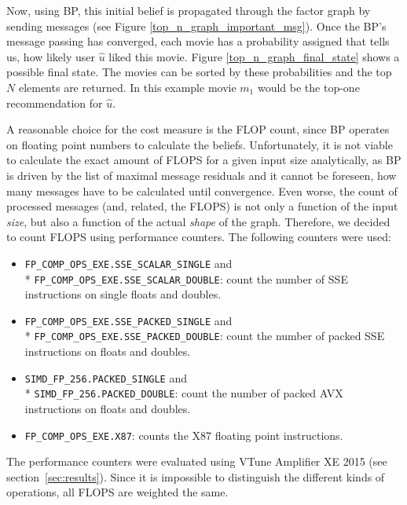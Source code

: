Now, using BP, this initial belief is propagated through the factor graph by sending messages (see Figure \ref{top_n_graph_important_msg}). Once the BP's message passing has converged, each movie has a probability assigned that tells us, how likely user $\hat u$ liked this movie. Figure \ref{top_n_graph_final_state} shows a possible final state. The movies can be sorted by these probabilities and the top $N$ elements are returned. In this example movie $m_1$ would be the top-one recommendation for $\hat u$.


A reasonable choice for the cost measure is the FLOP count, since BP operates on floating point numbers to calculate the beliefs. Unfortunately, it is not viable to calculate the exact amount of FLOPS for a given input size analytically, as BP is driven by the list of maximal message residuals and it cannot be foreseen, how many messages have to be calculated until convergence. Even worse, the count of processed messages (and, related, the FLOPS) is not only a function of the input \textit{size}, but also a function of the actual \textit{shape} of the graph. Therefore, we decided to count FLOPS using performance counters. The following counters were used:

\begin{itemize}
	\item \texttt{FP\_COMP\_OPS\_EXE.SSE\_SCALAR\_SINGLE} and \\* \texttt{FP\_COMP\_OPS\_EXE.SSE\_SCALAR\_DOUBLE}: count the number of SSE instructions on single floats and doubles.
	\item \texttt{FP\_COMP\_OPS\_EXE.SSE\_PACKED\_SINGLE} and \\* \texttt{FP\_COMP\_OPS\_EXE.SSE\_PACKED\_DOUBLE}: count the number of packed SSE instructions on floats and doubles.
	\item \texttt{SIMD\_FP\_256.PACKED\_SINGLE} and \\* \texttt{SIMD\_FP\_256.PACKED\_DOUBLE}: count the number of packed AVX instructions on floats and doubles.
	\item \texttt{FP\_COMP\_OPS\_EXE.X87}: counts the X87 floating point instructions.
\end{itemize}

The performance counters were evaluated using VTune Amplifier XE 2015 (see section~\ref{sec:results}).
Since it is impossible to distinguish the different kinds of operations, all FLOPS are weighted the same.


%
%
%

